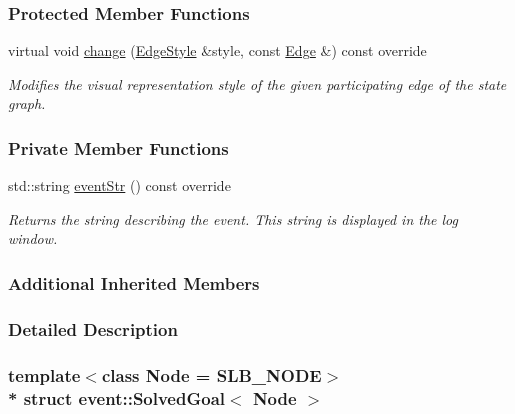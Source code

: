 \subsubsection*{Protected Member Functions}
\begin{DoxyCompactItemize}
\item 
virtual void \hyperlink{structevent_1_1SolvedGoal_a9472c47dd4f79228b463a48c15b42796}{change} (\hyperlink{structEdgeStyle}{Edge\+Style} \&style, const \hyperlink{structevent_1_1UniformChange_a74eab4759202393dcf9438a25bd9261e}{Edge} \&) const override\hypertarget{structevent_1_1SolvedGoal_a9472c47dd4f79228b463a48c15b42796}{}\label{structevent_1_1SolvedGoal_a9472c47dd4f79228b463a48c15b42796}

\begin{DoxyCompactList}\small\item\em Modifies the visual representation style of the given participating edge of the state graph. \end{DoxyCompactList}\end{DoxyCompactItemize}
\subsubsection*{Private Member Functions}
\begin{DoxyCompactItemize}
\item 
std\+::string \hyperlink{structevent_1_1SolvedGoal_a58d5e8b3d9b34f9a1813dd4cc1f32691}{event\+Str} () const override
\begin{DoxyCompactList}\small\item\em Returns the string describing the event. This string is displayed in the log window. \end{DoxyCompactList}\end{DoxyCompactItemize}
\subsubsection*{Additional Inherited Members}


\subsubsection{Detailed Description}
\subsubsection*{template$<$class Node = S\+L\+B\+\_\+\+N\+O\+DE$>$\\*
struct event\+::\+Solved\+Goal$<$ Node $>$}

